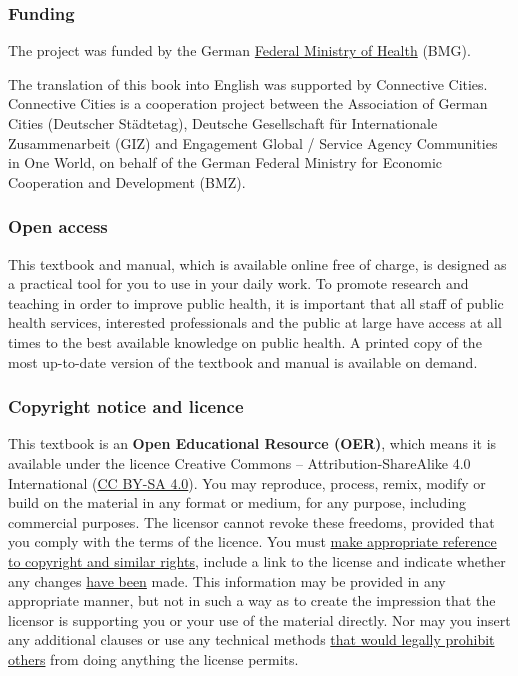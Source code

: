 \documentclass{article}
\begin{document}
\subsubsection{Funding}\label{H1593607}



The project was funded by the German \href{https://www.bundesgesundheitsministerium.de/english-version.html}{Federal Ministry of Health} (BMG).


The translation of this book into English was supported by Connective Cities. Connective Cities is a cooperation project between the Association of German Cities (Deutscher Städtetag), Deutsche Gesellschaft für Internationale Zusammenarbeit (GIZ) and Engagement Global / Service Agency Communities in One World, on behalf of the German Federal Ministry for Economic Cooperation and Development (BMZ).


\subsubsection{Open access}\label{H3712911}



This textbook and manual, which is available online free of charge, is designed as a practical tool for you to use in your daily work. To promote research and teaching in order to improve public health, it is important that all staff of public health services, interested professionals and the public at large have access at all times to the best available knowledge on public health. A printed copy of the most up-to-date version of the textbook and manual is available on demand.


\subsubsection{Copyright notice and licence}\label{H7708600}



This textbook is an \textbf{Open Educational Resource (OER)}, which means it is available under the licence Creative Commons – Attribution-ShareAlike 4.0 International (\href{https://creativecommons.org/licenses/by-sa/4.0/legalcode}{CC BY-SA 4.0}). You may reproduce, process, remix, modify or build on the material in any format or medium, for any purpose, including commercial purposes. The licensor cannot revoke these freedoms, provided that you comply with the terms of the licence. You must \href{https://creativecommons.org/licenses/by-sa/4.0/legalcode}{make appropriate reference to copyright and similar rights}, include a link to the license and indicate whether any changes \href{https://creativecommons.org/licenses/by-sa/4.0/legalcode}{have been} made. This information may be provided in any appropriate manner, but not in such a way as to create the impression that the licensor is supporting you or your use of the material directly. Nor may you insert any additional clauses or use any technical methods \href{https://creativecommons.org/licenses/by-sa/4.0/legalcode}{that would legally prohibit others} from doing anything the license permits.
\end{document}

